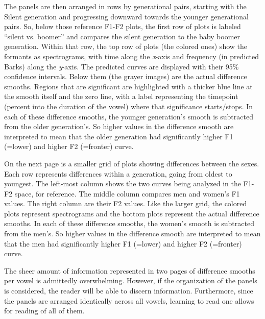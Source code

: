 The panels are then arranged in rows by generational pairs, starting with the Silent generation and progressing downward towards the younger generational pairs. So, below those reference F1-F2 plots, the first row of plots is labeled ``silent vs. boomer'' and compares the silent generation to the baby boomer generation. Within that row, the top row of plots (the colored ones) show the formants as spectrograms, with time along the \textit{x}-axis and frequency (in predicted Barks) along the \textit{y}-axis. The predicted curves are displayed with their 95\% confidence intervals. Below them (the grayer images) are the actual difference smooths. Regions that are significant are highlighted with a thicker blue line at the smooth itself and the zero line, with a label representing the timepoint (percent into the duration of the vowel) where that significance starts/stops. In each of these difference smooths, the younger generation's smooth is subtracted from the older generation's. So higher values in the difference smooth are interpreted to mean that the older generation had significantly higher F1 (=lower) and higher F2 (=fronter) curve.

On the next page is a smaller grid of plots showing differences between the sexes. Each row represents differences within a generation, going from oldest to youngest. The left-most column shows the two curves being analyzed in the F1-F2 space, for reference. The middle column compares men and women's F1 values. The right column are their F2 values. Like the larger grid, the colored plots represent spectrograms and the bottom plots represent the actual difference smooths. In each of these difference smooths, the women's smooth is subtracted from the men's. So higher values in the difference smooth are interpreted to mean that the men had significantly higher F1 (=lower) and higher F2 (=fronter) curve.

The sheer amount of information represented in two pages of difference smooths per vowel is admittedly overwhelming. However, if the organization of the panels is considered, the reader will be able to discern information. Furthermore, since the panels are arranged identically across all vowels, learning to read one allows for reading of all of them.


